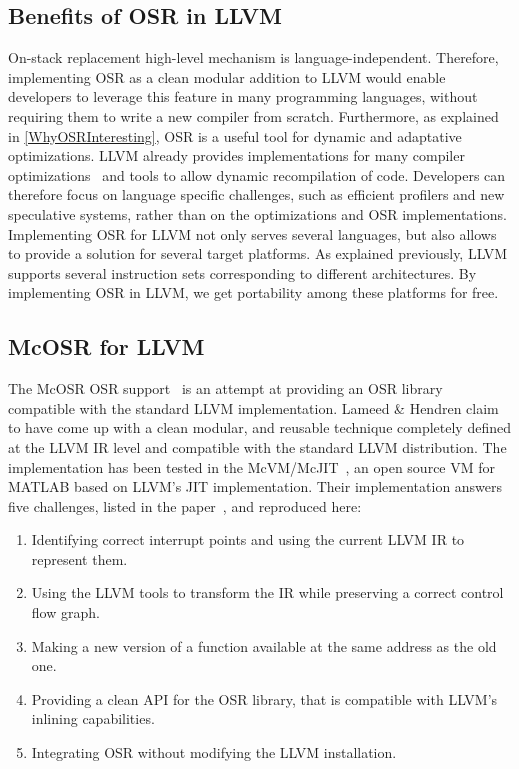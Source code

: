 \subsection{Benefits of OSR in LLVM}

On-stack replacement high-level mechanism is language-independent.
Therefore, implementing OSR as a clean modular addition to LLVM would enable developers to leverage this feature in many programming languages, without requiring them to write a new compiler from scratch.
Furthermore, as explained in \ref{WhyOSRInteresting}, OSR is a useful tool for dynamic and adaptative optimizations.
LLVM already provides implementations for many compiler optimizations~\cite{llvmUrl} and tools to allow dynamic recompilation of code.
Developers can therefore focus on language specific challenges, such as efficient profilers and new speculative systems, rather than on the optimizations and OSR implementations.\\

Implementing OSR for LLVM not only serves several languages, but also allows to provide a solution for several target platforms.
As explained previously, LLVM supports several instruction sets corresponding to different architectures.
By implementing OSR in LLVM, we get portability among these platforms for free.\\

\subsection{McOSR for LLVM}\label{McOSR}
The McOSR OSR support~\cite{lameed2013modular} is an attempt at providing an OSR library compatible with the standard LLVM implementation. 
Lameed \& Hendren claim to have come up with a clean modular, and reusable technique completely defined at the LLVM IR level and compatible with the standard LLVM distribution.
The implementation has been tested in the McVM/McJIT~\cite{chevalier2010optimizing, McVM}, an open source VM for MATLAB based on LLVM's JIT implementation.
Their implementation answers five challenges, listed in the paper~\cite{lameed2013modular}, and reproduced here:\\ 

\begin{enumerate}
    \item Identifying correct interrupt points and using the current LLVM IR to represent them.
    \item Using the LLVM tools to transform the IR while preserving a correct control flow graph. 
    \item Making a new version of a function available at the same address as the old one.
    \item Providing a clean API for the OSR library, that is compatible with LLVM's inlining capabilities.
    \item Integrating OSR without modifying the LLVM installation.
\end{enumerate}


